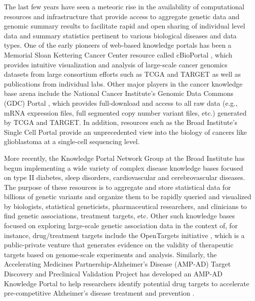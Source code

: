 \documentclass[letter]{bioinfo}
\begin{document}
The last few years have seen a meteoric rise in the availability of computational resources and infrastructure that provide access to aggregate genetic data and genomic summary results to facilitate rapid and open sharing of individual level data and summary statistics pertinent to various biological diseases and data types.  One of the early pioneers of web-based knowledge portals has been a Memorial Sloan Kettering Cancer Center resource called cBioPortal \citep{Cerami:2012:cBio,Gao:2013:Integrative}, which provides intuitive visualization and analysis of large-scale cancer genomics datasets from large consortium efforts such as TCGA \citep{TheCancerGenomeAtlasResearchNetwork:2013:Cancer} and TARGET \citep{Koscielny:2017:Open} as well as publications from individual labs.  Other major players in the cancer knowledge base arena include the National Cancer Institute's Genomic Data Commons (GDC) Portal \citep{Grossman:2016:Shared,Jensen:2017:NCI}, which provides full-download and access to all raw data (e.g., mRNA expression files, full segmented copy number variant files, etc.) generated by TCGA and TARGET.  In addition, resources such as the Broad Institute's Single Cell Portal \citep{Broad:NA:Single} provide an unprecedented view into the biology of cancers like glioblastoma at a single-cell sequencing level.    
	
More recently, the Knowledge Portal Network Group at the Broad Institute has begun implementing a wide variety of complex disease knowledge bases focused on type II diabetes, sleep disorders, cardiovascular and cerebrovascular diseases.  The purpose of these resources is to aggregate and store statistical data for billions of genetic variants and organize them to be rapidly queried and visualized by biologists, statistical geneticists, pharmaceutical researchers, and clinicians to find genetic associations, treatment targets, etc.  Other such knowledge bases focused on exploring large-scale genetic association data in the context of, for instance, drug/treatment targets include the OpenTargets initiative \citep{Koscielny:2017:Open}, which is a public-private venture that generates evidence on the validity of therapeutic targets based on genome-scale experiments and analysis.  Similarly, the Accelerating Medicines Partnership-Alzheimer's Disease (AMP-AD) Target Discovery and Preclinical Validation Project has developed an AMP-AD Knowledge Portal to help researchers identify potential drug targets to accelerate pre-competitive Alzheimer's disease treatment and prevention \citep{NIA:2015:AMP}.  
	
\end{document}
